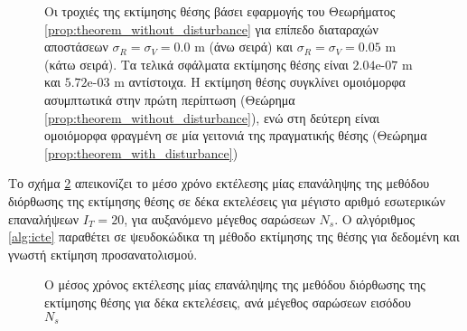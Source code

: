 \begin{figure}[!h]\centering\vspace{1cm}
  
\caption{\small Οι τροχιές της εκτίμησης θέσης βάσει εφαρμογής του Θεωρήματος
         \ref{prop:theorem_without_disturbance} για επίπεδο διαταραχών
         αποστάσεων $\sigma_R = \sigma_V = 0.0$ m (άνω σειρά) και
         $\sigma_R = \sigma_V = 0.05$ m (κάτω σειρά). Τα τελικά σφάλματα
         εκτίμησης θέσης είναι $2.04$e-$07$ m και $5.72$e-$03$ m αντίστοιχα.
         Η εκτίμηση θέσης συγκλίνει ομοιόμορφα ασυμπτωτικά στην πρώτη περίπτωση
         (Θεώρημα \ref{prop:theorem_without_disturbance}), ενώ στη δεύτερη
         είναι ομοιόμορφα φραγμένη σε μία γειτονιά της πραγματικής θέσης
         (Θεώρημα \ref{prop:theorem_with_disturbance})}
\label{fig:02_04_03:map_convergence}
\end{figure}

Το σχήμα \ref{fig:02_04_03:execution_times} απεικονίζει το μέσο χρόνο εκτέλεσης
μίας επανάληψης της μεθόδου διόρθωσης της εκτίμησης θέσης σε δέκα εκτελέσεις
για μέγιστο αριθμό εσωτερικών επαναλήψεων $I_T = 20$, για αυξανόμενο μέγεθος
σαρώσεων $N_s$. Ο αλγόριθμος \ref{alg:icte} παραθέτει σε ψευδοκώδικα τη μέθοδο
εκτίμησης της θέσης για δεδομένη και γνωστή εκτίμηση προσανατολισμού.

\begin{figure}[!h]\centering
  
\caption{\small Ο μέσος χρόνος εκτέλεσης μίας επανάληψης της μεθόδου διόρθωσης
         της εκτίμησης θέσης για δέκα εκτελέσεις, ανά μέγεθος σαρώσεων εισόδου
         $N_s$}
\label{fig:02_04_03:execution_times}
\end{figure}


